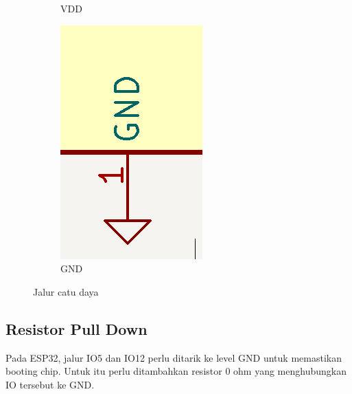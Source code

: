 \documentclass[12pt]{book}
\begin{document}
\begin{figure}[!ht]
\begin{subfigure}[t]{0.1\textwidth}
			\caption{VDD}
		\end{subfigure}
		\begin{subfigure}[t]{0.1\textwidth}
			\includegraphics[width=\textwidth]{images/sch/sch_gnd}
			\caption{GND}
		\end{subfigure}
		\caption{Jalur catu daya}
	\end{figure}

	\subsection{Resistor Pull Down}

	Pada ESP32, jalur IO5 dan IO12 perlu ditarik ke level GND untuk memastikan booting chip.
	Untuk itu perlu ditambahkan resistor 0 ohm yang menghubungkan IO tersebut ke GND.
\end{document}
